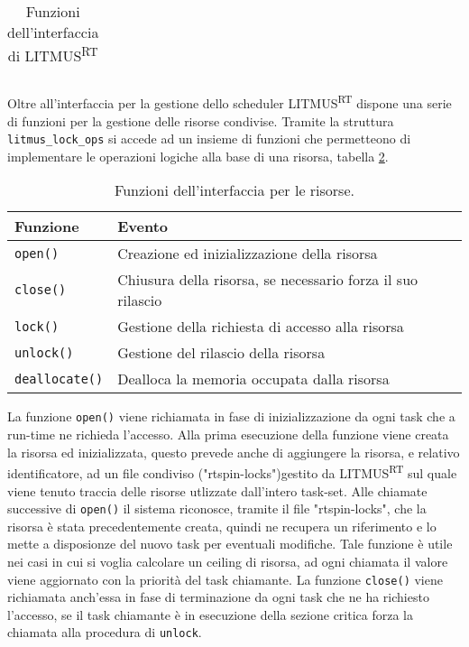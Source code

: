 \begin{appendices}
\begin{table}
\begin{tabular}{|ll|}
  	\hline
  	\end{tabular}
  \caption{Funzioni dell'interfaccia di LITMUS\textsuperscript{RT}}
  \label{tab:functions}
\end{table}

\noindent Oltre all'interfaccia per la gestione dello scheduler LITMUS\textsuperscript{RT} dispone una serie di funzioni per la gestione delle risorse condivise. Tramite la struttura \texttt{litmus\_lock\_ops} si accede ad un insieme di funzioni che permetteono di implementare le operazioni logiche alla base di una risorsa, tabella \ref{tab:functions_resource}.\\

\begin{table}
  \centering
  \begin{tabular}{|ll|}
	\hline
	    Funzione & Evento \\ \hline \hline
	   
\texttt{open()}			& Creazione ed inizializzazione della risorsa \\
\texttt{close()}		& Chiusura della risorsa, se necessario forza il suo rilascio \\
\texttt{lock()}			& Gestione della richiesta di accesso alla risorsa \\
\texttt{unlock()}		& Gestione del rilascio della risorsa \\
\texttt{deallocate()}	& Dealloca la memoria occupata dalla risorsa \\

  	\hline
  	\end{tabular}
  \caption{Funzioni dell'interfaccia per le risorse.}
  \label{tab:functions_resource}
\end{table}

\noindent La funzione \texttt{open()} viene richiamata in fase di inizializzazione da ogni task che a run-time ne richieda l'accesso. Alla prima esecuzione della funzione viene creata la risorsa ed inizializzata, questo prevede anche di aggiungere la risorsa, e relativo identificatore, ad un file condiviso ("rtspin-locks")gestito da LITMUS\textsuperscript{RT} sul quale viene tenuto traccia delle risorse utlizzate dall'intero task-set. Alle chiamate successive di \texttt{open()} il sistema riconosce, tramite il file "rtspin-locks", che la risorsa è stata precedentemente creata, quindi ne recupera un riferimento e lo mette a disposionze del nuovo task per eventuali modifiche. Tale funzione è utile nei casi in cui si voglia calcolare un ceiling di risorsa, ad ogni chiamata il valore viene aggiornato con la priorità del task chiamante. La funzione \texttt{close()} viene richiamata anch'essa in fase di terminazione da ogni task che ne ha richiesto l'accesso, se il task chiamante è in esecuzione della sezione critica forza la chiamata alla procedura di \texttt{unlock}.\\


\end{appendices}
